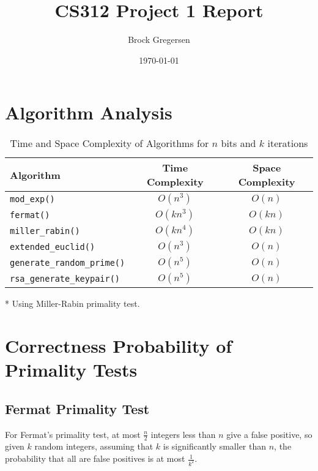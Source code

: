 \documentclass[12pt]{article}
\title{CS312 Project 1 Report}
\author{Brock Gregersen}
\date{\today}
\begin{document}
\maketitle

\section{Algorithm Analysis}

\begin{table}[h!]
\centering
\begin{threeparttable}
\begin{tabular}{@{}lcc@{}}
\toprule
\textbf{Algorithm}                  & \textbf{Time Complexity}   & \textbf{Space Complexity} \\ \midrule
\texttt{mod\_exp()}                 & $O(n^{3})$                 & $O(n)$              \\
\texttt{fermat()}                   & $O(kn^{3})$                & $O(kn)$                    \\
\texttt{miller\_rabin()}            & $O(kn^{4})$                & $O(kn)$                     \\
\texttt{extended\_euclid()}         & $O(n^{3})$                 & $O(n)$                      \\
\texttt{generate\_random\_prime()}\tnote{*}   
                                    & $O(n^{5})$                 & $O(n)$                      \\
\texttt{rsa\_generate\_keypair()}\tnote{*} 
                                    & $O(n^{5})$                 & $O(n)$                      \\ \bottomrule
\end{tabular}
\begin{tablenotes}
\item[*] Using Miller-Rabin primality test.
\end{tablenotes}
\end{threeparttable}
\caption{Time and Space Complexity of Algorithms for $n$ bits and $k$ iterations}
\label{tab:complexities}
\end{table}

\section{Correctness Probability of Primality Tests}

\subsection{Fermat Primality Test}
For Fermat's primality test, at most $\frac{n}{2}$ integers less than $n$ give a false positive, so given $k$ random integers, assuming that $k$ is significantly smaller than $n$, the probability that all are false positives is at most $\frac{1}{k^{2}}$.
\end{document}
